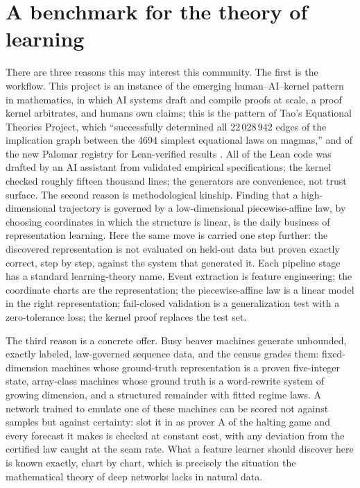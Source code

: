 \documentclass[11pt]{article}
\begin{document}
\section{A benchmark for the theory of learning}
There are three reasons this may interest this community. The first
is the workflow. This project is an instance of
the emerging human--AI--kernel pattern in mathematics, in which AI
systems draft and compile proofs at scale, a proof kernel
arbitrates, and humans own claims; this is the pattern of Tao's
Equational Theories Project, which ``successfully determined all
22\,028\,942 edges of the implication graph between the 4694
simplest equational laws on magmas,'' and of the new Palomar
registry for Lean-verified results \cite{etp,palomar}. All
of the Lean code was drafted by an AI assistant from validated
empirical
specifications; the kernel checked roughly fifteen thousand lines; the
generators are convenience, not trust surface. The second reason is
methodological kinship. Finding that a high-dimensional trajectory is
governed by a low-dimensional piecewise-affine law, by choosing
coordinates in which the structure is linear, is the daily business of
representation learning. Here the same move is carried one step
further: the discovered representation is not evaluated on held-out
data but proven exactly correct, step by step, against the system
that generated it. Each pipeline stage has a standard learning-theory
name. Event extraction is feature engineering; the coordinate charts
are the representation; the piecewise-affine law is a linear model in
the right representation; fail-closed validation is a generalization
test with a zero-tolerance loss; the kernel proof replaces the test
set.

The third reason is a concrete offer. Busy beaver machines generate
unbounded, exactly labeled, law-governed sequence data, and the
census grades them: fixed-dimension machines whose ground-truth
representation is a proven five-integer state, array-class machines
whose ground truth is a word-rewrite system of growing dimension,
and a structured remainder with fitted regime laws. A network
trained to emulate one of these machines can be scored not against
samples but against certainty: slot it in as prover A of the halting
game and every forecast it makes is checked at constant cost, with
any deviation from the certified law caught at the seam rate. What a
feature learner should discover here is known exactly, chart by
chart, which is precisely the situation the mathematical theory of
deep networks lacks in natural data.
\end{document}
